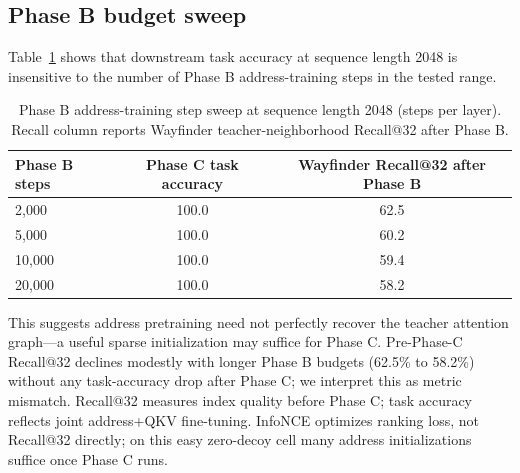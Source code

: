 \documentclass{article}
\begin{document}
\begin{table}[H]
\caption{Length curriculum under our training recipe (orchestrator \texttt{curriculum\_full}), through $T{=}4096$. Recall column: Wayfinder teacher-neighborhood Recall@32 after Phase B on each length-transfer run.}
\centering
\small
{}
\label{tab:curriculum}
\end{table}

\subsection{Phase B budget sweep}

Table~\ref{tab:bsweep} shows that downstream task accuracy at sequence length 2048 is insensitive to the number of Phase B address-training steps in the tested range.

\begin{table}[H]
\caption{Phase B address-training step sweep at sequence length 2048 (steps per layer). Recall column reports Wayfinder teacher-neighborhood Recall@32 after Phase B.}
\centering
\small
\begin{tabular}{lcc}
\toprule
Phase B steps & Phase C task accuracy & Wayfinder Recall@32 after Phase B \\
\midrule
2,000 & 100.0 & 62.5 \\
5,000 & 100.0 & 60.2 \\
10,000 & 100.0 & 59.4 \\
20,000 & 100.0 & 58.2 \\
\bottomrule
\end{tabular}
\label{tab:bsweep}
\end{table}

This suggests address pretraining need not perfectly recover the teacher attention graph---a useful sparse initialization may suffice for Phase C. Pre-Phase-C Recall@32 declines modestly with longer Phase B budgets (62.5\% to 58.2\%) without any task-accuracy drop after Phase C; we interpret this as metric mismatch. Recall@32 measures index quality before Phase C; task accuracy reflects joint address+QKV fine-tuning. InfoNCE optimizes ranking loss, not Recall@32 directly; on this easy zero-decoy cell many address initializations suffice once Phase C runs.
\end{document}
